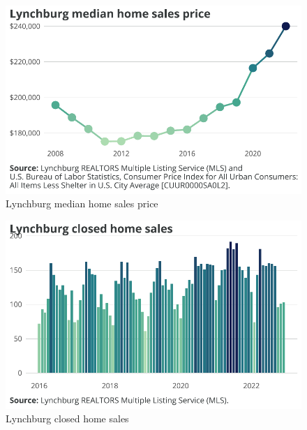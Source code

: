 \documentclass[
  letterpaper,
  DIV=11,
  numbers=noendperiod]{scrreprt}
\begin{document}
\begin{figure}[H]

{\centering \includegraphics{./part-3-3_files/figure-pdf/fig-lburg-sales-1.pdf}

}

\caption{\label{fig-lburg-sales}Lynchburg median home sales price}

\end{figure}

\begin{figure}[H]

{\centering \includegraphics{./part-3-3_files/figure-pdf/fig-lburg-sold-1.pdf}

}

\caption{\label{fig-lburg-sold}Lynchburg closed home sales}

\end{figure}
\end{document}
